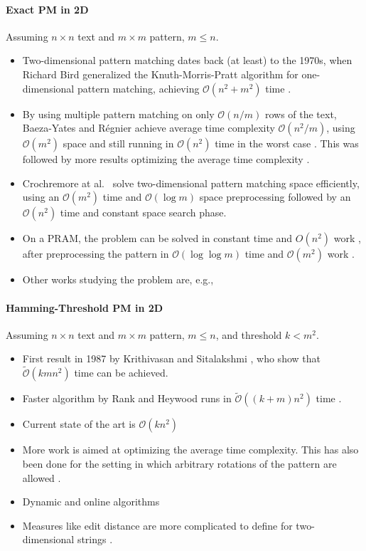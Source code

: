 \documentclass[11pt]{article}
\renewcommand{\O}{\mathcal{O}}
\newcommand{\tO}{\tilde{\mathcal{O}}}
\theoremstyle{plain}
\theoremstyle{definition}
\theoremstyle{remark}
\newcommand{\jonas}[2][]{\todo[color=green!40, #1]{\textbf{J:} #2}}
\begin{document}
\paragraph{Exact PM in 2D}

Assuming $n \times n$ text and $m \times m$ pattern, $m \leq n$.

\begin{itemize}
	\item Two-dimensional pattern matching dates back (at least) to the 1970s, when Richard Bird generalized the Knuth-Morris-Pratt algorithm \cite{Knuth1977} for one-dimensional pattern matching, achieving $\O(n^2 + m^2)$ time \cite{Bird1977}.
	\item By using multiple pattern matching on only $\O(n/m)$ rows of the text, Baeza-Yates and Régnier achieve average time complexity $\O(n^2 / m)$, using $\O(m^2)$ space and still running in $\O(n^2)$ time in the worst case \cite{Baeza-Yates1993}. This was followed by more results optimizing the average time complexity \cite{Tarhio1996,Kaerkkaeinen1999}.
	\item Crochremore at al.\ \cite{Crochemore1995} solve two-dimensional pattern matching space efficiently, using an $\O(m^2)$ time and $\O(\log m)$ space preprocessing followed by an $\O(n^2)$ time and constant space search phase.
	\item On a PRAM, the problem can be solved in constant time and $O(n^2)$ work \cite{Crochemore1998}, after preprocessing the pattern in $\O(\log \log m)$ time and $\O(m^2)$ work \cite{Cole1993}.
	\item Other works studying the problem are, e.g., \cite{Baker1978,Karp1987,Zhu1988,Zhu1989,Amir1994,Galil1996}
\end{itemize}

\paragraph{Hamming-Threshold PM in 2D} Assuming $n \times n$ text and $m \times m$ pattern, $m \leq n$, and threshold $k < m^2$.

\begin{itemize}
	\item First result in 1987 by Krithivasan and Sitalakshmi \cite{Krithivasan1987}, who show that $\tO(kmn^2)$ time can be achieved.
	\item Faster algorithm by Rank and Heywood runs in $\tO((k+m)n^2)$ time \cite{Ranka1991}.
	\item Current state of the art\jonas{check} is $\O(kn^2)$ \cite{Amir1991}
	\item More work \cite{Baeza-Yates1998,Park1998,Kaerkkaeinen1999} is aimed at optimizing the average time complexity. This has also been done for the setting in which arbitrary rotations of the pattern are allowed \cite{Fredriksson2002}.
	\item Dynamic and online algorithms \cite{Clifford2016}
	\item Measures like edit distance are more complicated to define for two-dimensional strings \cite{Baeza-Yates1998a}.
\end{itemize}
\end{document}

